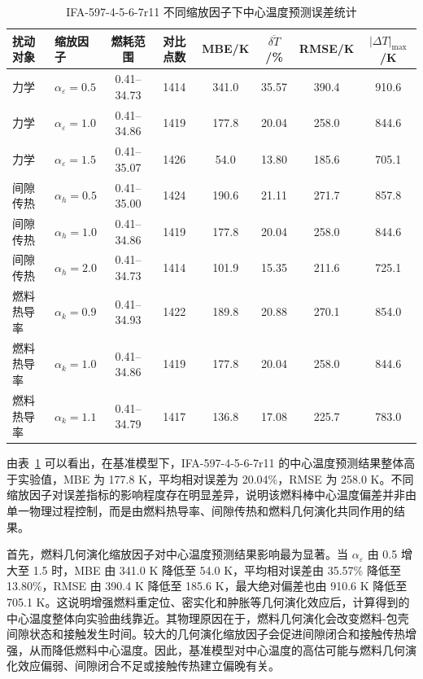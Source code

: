 \begin{table}[htbp]
	\centering
	\caption{IFA-597-4-5-6-7r11 不同缩放因子下中心温度预测误差统计}
	\label{tab:ifa597r11_temperature_alpha_sensitivity_error}
	\small
	\begin{tabular}{llcccccc}
		\toprule
		扰动对象 & 缩放因子 & 燃耗范围 & 对比点数 & MBE/K & $\overline{\delta T}$/\% & RMSE/K & $|\Delta T|_{\max}$/K \\
		\midrule
		力学 & $\alpha_{\varepsilon}=0.5$ & 0.41--34.73 & 1414 & 341.0 & 35.57 & 390.4 & 910.6 \\
		力学 & $\alpha_{\varepsilon}=1.0$ & 0.41--34.86 & 1419 & 177.8 & 20.04 & 258.0 & 844.6 \\
		力学 & $\alpha_{\varepsilon}=1.5$ & 0.41--35.07 & 1426 & 54.0 & 13.80 & 185.6 & 705.1 \\
		\midrule
		间隙传热 & $\alpha_h=0.5$ & 0.41--35.00 & 1424 & 190.6 & 21.11 & 271.7 & 857.8 \\
		间隙传热 & $\alpha_h=1.0$ & 0.41--34.86 & 1419 & 177.8 & 20.04 & 258.0 & 844.6 \\
		间隙传热 & $\alpha_h=2.0$ & 0.41--34.73 & 1414 & 101.9 & 15.35 & 211.6 & 725.1 \\
		\midrule
		燃料热导率 & $\alpha_k=0.9$ & 0.41--34.93 & 1422 & 189.8 & 20.88 & 270.1 & 854.0 \\
		燃料热导率 & $\alpha_k=1.0$ & 0.41--34.86 & 1419 & 177.8 & 20.04 & 258.0 & 844.6 \\
		燃料热导率 & $\alpha_k=1.1$ & 0.41--34.79 & 1417 & 136.8 & 17.08 & 225.7 & 783.0 \\
		\bottomrule
	\end{tabular}
\end{table}

由表~\ref{tab:ifa597r11_temperature_alpha_sensitivity_error} 可以看出，在基准模型下，IFA-597-4-5-6-7r11 的中心温度预测结果整体高于实验值，MBE 为 177.8 K，平均相对误差为 20.04\%，RMSE 为 258.0 K。不同缩放因子对误差指标的影响程度存在明显差异，说明该燃料棒中心温度偏差并非由单一物理过程控制，而是由燃料热导率、间隙传热和燃料几何演化共同作用的结果。

首先，燃料几何演化缩放因子对中心温度预测结果影响最为显著。当 \(\alpha_{\varepsilon}\) 由 0.5 增大至 1.5 时，MBE 由 341.0 K 降低至 54.0 K，平均相对误差由 35.57\% 降低至 13.80\%，RMSE 由 390.4 K 降低至 185.6 K，最大绝对偏差也由 910.6 K 降低至 705.1 K。这说明增强燃料重定位、密实化和肿胀等几何演化效应后，计算得到的中心温度整体向实验曲线靠近。其物理原因在于，燃料几何演化会改变燃料-包壳间隙状态和接触发生时间。较大的几何演化缩放因子会促进间隙闭合和接触传热增强，从而降低燃料中心温度。因此，基准模型对中心温度的高估可能与燃料几何演化效应偏弱、间隙闭合不足或接触传热建立偏晚有关。

